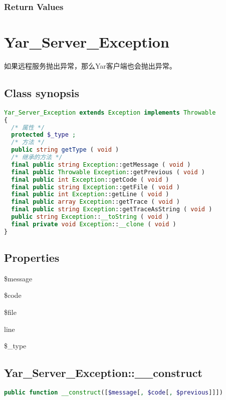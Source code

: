 \subsection{Return Values}


\chapter{Yar\_Server\_Exception}


如果远程服务抛出异常，那么Yar客户端也会抛出异常。

\section{Class synopsis}


\begin{lstlisting}[language=PHP]
Yar_Server_Exception extends Exception implements Throwable
{
  /* 属性 */
  protected $_type ;
  /* 方法 */
  public string getType ( void )
  /* 继承的方法 */
  final public string Exception::getMessage ( void )
  final public Throwable Exception::getPrevious ( void )
  final public int Exception::getCode ( void )
  final public string Exception::getFile ( void )
  final public int Exception::getLine ( void )
  final public array Exception::getTrace ( void )
  final public string Exception::getTraceAsString ( void )
  public string Exception::__toString ( void )
  final private void Exception::__clone ( void )
}
\end{lstlisting}


\section{Properties}


\begin{compactitem}
\item \$message
\item \$code
\item \$file
\item line
\item \$\_type
\end{compactitem}

\section{Yar\_Server\_Exception::\_\_construct}



\begin{lstlisting}[language=PHP]
public function __construct([$message[, $code[, $previous]]])
\end{lstlisting}





